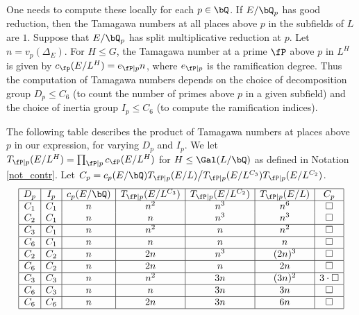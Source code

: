 \begin{example}
    One needs to compute these locally for each $p \in \bQ$. If $E / \bQ_p$ has good reduction, then the Tamagawa numbers at all places above $p$ in the subfields of $L$ are $1$. Suppose that $E / \bQ_p$ has split multiplicative reduction at $p$. Let $n = v_p(\Delta_E)$. For $H \leq G$, the Tamagawa number at a prime $\fP$ above $p$ in $L^H$ is given by $c_{\fp}(E / L^H) = e_{\fP \mid p} n$, where $e_{\fP \mid p}$ is the ramification degree. Thus the computation of Tamagawa numbers depends on the choice of decomposition group $D_p \leq C_6$ (to count the number of primes above $p$ in a given subfield) and the choice of inertia group $I_p \leq C_6$ (to compute the ramification indices). 
    
    The following table describes the product of Tamagawa numbers at places above $p$ in our expression, for varying $D_p$ and $I_p$. We let $T_{\fP \mid p}(E / L^H) = \prod_{\fP \mid p}c_{\fP}(E / L^H)$ for $H \leq \Gal(L / \bQ)$ as defined in Notation \ref{not_contr}. Let $C_p = c_p(E / \bQ)T_{\fP \mid p}(E / L) \big/ T_{\fP \mid p}(E / L^{C_3})T_{\fP \mid p}(E / L^{C_2})$. 
    \[
    \begin{array}{|c | c | c | c | c  |c | c|}
        \hline
        D_p & I_p & c_p(E / \bQ) & T_{\fP \mid p}(E / L^{C_3}) & T_{\fP \mid p}(E / L^{C_2}) & T_{\fP \mid p}(E / L) & C_p\\ 
        \hline
        C_1 & C_1 & n & n^2 & n^3 & n^6 & \square\\
        C_2 & C_1 & n & n & n^3 & n^3 & \square\\
        \hline
        C_3 & C_1 & n & n^2 & n & n^2 & \square \\
        \hline
        C_6 & C_1 & n & n & n & n & \square \\
        \hline
        C_2 & C_2 & n & 2n & n^3 & (2n)^3 & \square \\
        \hline
        C_6 & C_2 & n & 2n & n & 2n & \square \\
        \hline
        C_3 & C_3 & n & n^2 & 3n & (3n)^2 & 3\cdot\square \\
        \hline
        C_6 & C_3 & n & n & 3n & 3n & \square\\
        \hline
        C_6 & C_6 & n & 2n & 3n & 6n & \square\\ \hline
    \end{array}
    \]


\end{example}
